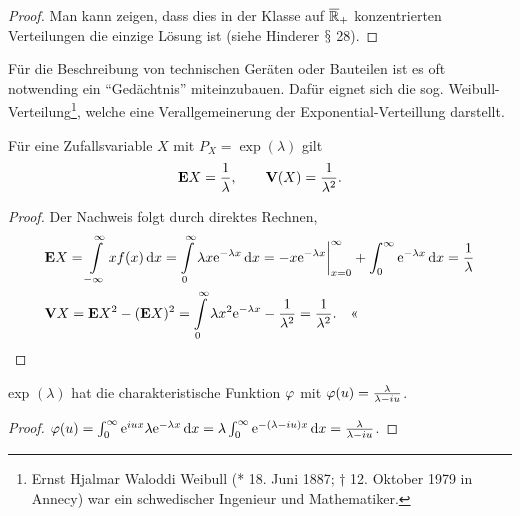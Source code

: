 \begin{bem}
\begin{proof}
Man kann zeigen, dass dies in der Klasse auf $\overline{\mathbb{R}}_+$ konzentrierten
Verteilungen die einzige Lösung ist (siehe Hinderer $\mathsection$ 28).\qedhere
\end{proof}

Für die Beschreibung von technischen Geräten oder Bauteilen ist es oft
notwending ein ``Gedächtnis'' miteinzubauen. Dafür eignet sich die sog.
Weibull-Verteilung\footnote{Ernst Hjalmar Waloddi Weibull (* 18. Juni 1887; †
12. Oktober 1979 in Annecy) war ein schwedischer Ingenieur und Mathematiker.},
welche eine Verallgemeinerung der Exponential-Verteillung darstellt.

Für eine Zufallsvariable $X$ mit $P_{X}= \exp (\lambda )$ gilt
\begin{align*}
\textbf{E} X=\frac{1}{\lambda},\qquad \textbf{V}(X) =\frac{1}{\lambda ^{2}}.
\end{align*}
\begin{proof}
Der Nachweis folgt durch direktes Rechnen,
\begin{align*}
&\textbf{E} X = \int\limits_{-\infty}^\infty xf(x)\,\mathrm{d} x
 = \int\limits_0^\infty
\lambda x\mathrm{e}^{-\lambda x}\,\mathrm{d} x 
= -x\mathrm{e}^{-\lambda x}\bigg|_{x=0}^\infty + \int_0^\infty \mathrm{e}^{-\lambda x}\,\mathrm{d} x
= \frac{1}{\lambda}\\
&\textbf{V} X = \textbf{E} X^2- (\textbf{E} X)^2
= \int\limits_0^\infty \lambda x^2\mathrm{e}^{-\lambda x}
- \frac{1}{\lambda^2}
= \frac{1}{\lambda^2}.\quad\text{<<}
\end{align*}
\end{proof}
exp $(\lambda )$ hat die charakteristische Funktion $\varphi$  mit $\varphi(u)
=\frac{\lambda }{\lambda - iu}$.
\begin{proof}
$\varphi(u)=\int_{0}^\infty \mathrm{e}^{iux}\lambda \mathrm{e}^{-\lambda x}\,\mathrm{d} x
=
\lambda \int_{0}^\infty \mathrm{e}^{-(\lambda-iu)x}\,\mathrm{d} x
 =
\frac{\lambda}{\lambda-iu}$.\qedhere\maphere
\end{proof}
\end{bem}

